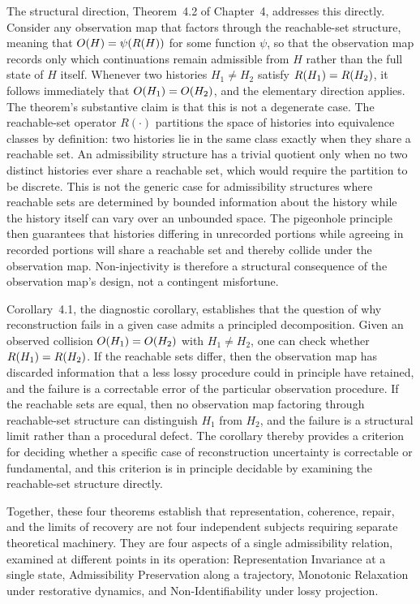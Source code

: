 The structural direction, Theorem~4.2 of Chapter~4, addresses this directly. Consider any observation map that factors through the reachable-set structure, meaning that $O(H) = \psi(R(H))$ for some function $\psi$, so that the observation map records only which continuations remain admissible from $H$ rather than the full state of $H$ itself. Whenever two histories $H_1 \neq H_2$ satisfy $R(H_1) = R(H_2)$, it follows immediately that $O(H_1) = O(H_2)$, and the elementary direction applies. The theorem's substantive claim is that this is not a degenerate case. The reachable-set operator $R(\cdot)$ partitions the space of histories into equivalence classes by definition: two histories lie in the same class exactly when they share a reachable set. An admissibility structure has a trivial quotient only when no two distinct histories ever share a reachable set, which would require the partition to be discrete. This is not the generic case for admissibility structures where reachable sets are determined by bounded information about the history while the history itself can vary over an unbounded space. The pigeonhole principle then guarantees that histories differing in unrecorded portions while agreeing in recorded portions will share a reachable set and thereby collide under the observation map. Non-injectivity is therefore a structural consequence of the observation map's design, not a contingent misfortune.

Corollary~4.1, the diagnostic corollary, establishes that the question of why reconstruction fails in a given case admits a principled decomposition. Given an observed collision $O(H_1) = O(H_2)$ with $H_1 \neq H_2$, one can check whether $R(H_1) = R(H_2)$. If the reachable sets differ, then the observation map has discarded information that a less lossy procedure could in principle have retained, and the failure is a correctable error of the particular observation procedure. If the reachable sets are equal, then no observation map factoring through reachable-set structure can distinguish $H_1$ from $H_2$, and the failure is a structural limit rather than a procedural defect. The corollary thereby provides a criterion for deciding whether a specific case of reconstruction uncertainty is correctable or fundamental, and this criterion is in principle decidable by examining the reachable-set structure directly.

Together, these four theorems establish that representation, coherence, repair, and the limits of recovery are not four independent subjects requiring separate theoretical machinery. They are four aspects of a single admissibility relation, examined at different points in its operation: Representation Invariance at a single state, Admissibility Preservation along a trajectory, Monotonic Relaxation under restorative dynamics, and Non-Identifiability under lossy projection.
